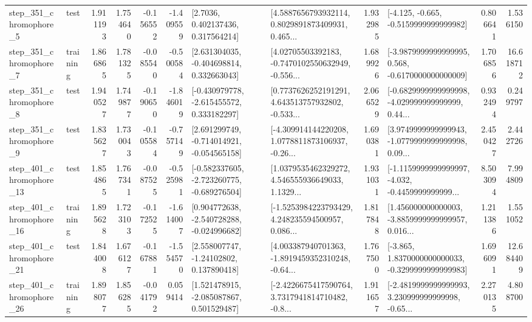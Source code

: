 \begin{tabular}{llrrrrllrlrr}
   step\_351\_chromophore\_5 &      test &      1.911193 &    1.754640 &     -0.156552 & -1.409559 &          [2.7036, 0.402137436, 0.317564214] &  [4.5887656793932114, 0.8029891873409931, 0.465... &       1.932985 &              [-4.125, -0.665, -0.5159999999999982] &            0.806641 &          1.536150 \\
   step\_351\_chromophore\_7 &  training &      1.866865 &    1.781325 &     -0.085540 & -0.500584 &    [2.631304035, -0.404698814, 0.332663043] &  [4.02705503392183, -0.7470102550632949, -0.556... &       1.689926 &  [-3.9879999999999995, 0.568, -0.6170000000000009] &            1.706856 &         16.618712 \\
   step\_351\_chromophore\_8 &      test &      1.940527 &    1.749877 &     -0.190650 & -1.846019 &   [-0.430979778, -2.615455572, 0.333182297] &  [0.7737626252191291, 4.643513757932802, -0.533... &       2.066529 &  [-0.6829999999999998, -4.029999999999999, 0.44... &            0.932494 &          0.249797 \\
   step\_351\_chromophore\_9 &      test &      1.835627 &    1.730043 &     -0.105584 & -0.757149 &   [2.691299749, -0.714014921, -0.054565158] &  [-4.309914144220208, 1.0778811873106937, -0.26... &       1.690381 &  [3.9749999999999943, -1.0779999999999998, 0.09... &            2.450427 &          2.442726 \\
  step\_401\_chromophore\_13 &      test &      1.854865 &    1.767341 &     -0.087525 & -0.525981 &  [-0.582337605, -2.723260775, -0.689276504] &  [1.0379535462329272, 4.546555936649033, 1.1329... &       1.931031 &  [-1.1159999999999997, -4.032, -0.4459999999999... &            8.503094 &          7.994809 \\
  step\_401\_chromophore\_16 &  training &      1.895628 &    1.723103 &     -0.172525 & -1.614007 &   [0.904772638, -2.540728288, -0.024996682] &  [-1.5253984223793429, 4.248235594500957, 0.086... &       1.817848 &  [1.456000000000003, -3.8859999999999957, 0.016... &            1.211386 &          1.551052 \\
  step\_401\_chromophore\_21 &      test &      1.844008 &    1.676127 &     -0.167881 & -1.554570 &     [2.558007747, -1.24102802, 0.137890418] &  [4.003387940701363, -1.8919459352310248, -0.64... &       1.767500 &  [-3.865, 1.8370000000000033, -0.3299999999999983] &            1.696091 &         12.684409 \\
  step\_401\_chromophore\_26 &  training &      1.898077 &    1.856285 &     -0.041792 &  0.059414 &    [1.521478915, -2.085087867, 0.501529487] &  [-2.4226675417590764, 3.7317941814710482, -0.8... &       1.911657 &  [-2.4819999999999993, 3.230999999999998, -0.65... &            2.270135 &          4.808700 \\

\end{tabular}
